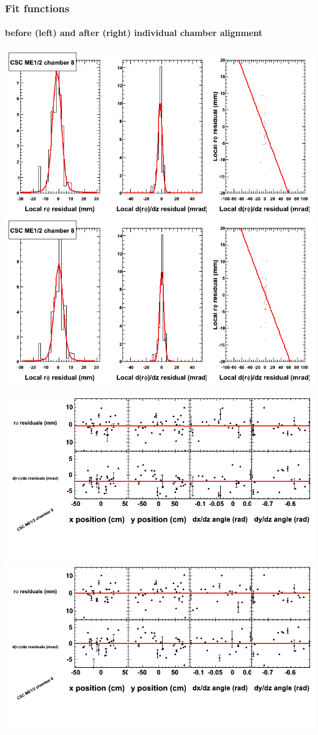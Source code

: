 \documentclass[compress]{beamer}
\begin{document}
\begin{frame}
\frametitle{Fit functions}
\framesubtitle{before (left) and after (right) individual chamber alignment}
\includegraphics[width=0.5\linewidth]{ringfits_3dof/beforefit_MEp12_08_bellcurve.png} \includegraphics[width=0.5\linewidth]{ringfits_3dof/afterfit_MEp12_08_bellcurve.png}

\includegraphics[width=0.5\linewidth]{ringfits_3dof/beforefit_MEp12_08_polynomials.png} \includegraphics[width=0.5\linewidth]{ringfits_3dof/afterfit_MEp12_08_polynomials.png}
\end{frame}
\end{document}
